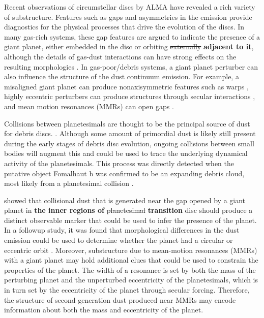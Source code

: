 \documentclass[fleqn,usenatbib]{mnras}
\begin{document}
Recent observations of circumstellar discs by ALMA have revealed a rich variety of substructure. Features such as gaps and asymmetries 
\citep{2015ApJ...808L...3A, 2016Sci...353.1519P, PhysRevLett.117.251101, 2016ApJ...820L..40A, 2016Natur.535..258C} in the emission provide 
diagnostics for the physical processes that drive the evolution of the discs. In many gas-rich systems, these gap features are argued to indicate the 
presence of a giant planet, either embedded in the disc \citep{2015MNRAS.453L..73D} or orbiting \sout{externally} \textbf{adjacent to it}, although the details of gas-dust 
interactions can have strong effects on the resulting morphologies
\citep{2018ApJ...866..110D}. In gas-poor/debris systems, a giant
planet perturber can also influence 
the structure of the dust continuum emission. For example, a misaligned giant planet can produce nonaxisymmetric features such as warps 
\citep{2001A&A...370..447A}, highly eccentric perturbers can produce structures through secular interactions 
\citep{2014MNRAS.443.2541P, 2015MNRAS.448.3679P}, and mean motion resonances (MMRs) can open gaps
\citep{2015ApJ...798...83N, 2016ApJ...818..159T, 2018ApJ...857....3T}.

Collisions between planetesimals are thought to be the principal source of dust for debris discs. \citep[see][]{2008ARA&A..46..339W}.  Although some 
amount of primordial dust is likely still present during the early stages of debris disc evolution, ongoing collisions between small bodies will augment 
this and could be used to trace the underlying dynamical activity of the planetesimals. This process was directly detected when the putative object 
Fomalhaut b was confirmed to be an expanding debris cloud, most likely from a planetesimal collision \citep{2020PNAS..117.9712G}. 

\citet{2013ApJ...777L..31D} showed that collisional dust that is generated near the gap opened by a giant planet in \textbf{the inner regions of} \sout{planetesimal} \textbf{transition} disc should 
produce a distinct observable marker that could be used to infer the presence of the planet. In a followup study, it was found that morphological 
differences in the dust emission could be used to determine whether the planet had a circular or eccentric orbit \citep{2016ApJ...820...29D}. Moreover, 
substructure due to mean-motion resonances (MMRs) with a giant planet may hold additional clues that could be used to constrain the properties of 
the planet.  The width of a resonance is set by both the mass of the perturbing planet and the unperturbed eccentricity of the planetesimals, 
which is in turn set by the eccentricity of the planet through secular forcing. Therefore, the structure of second generation dust produced near MMRs 
may encode information about both the mass and eccentricity of the planet.
\end{document}
